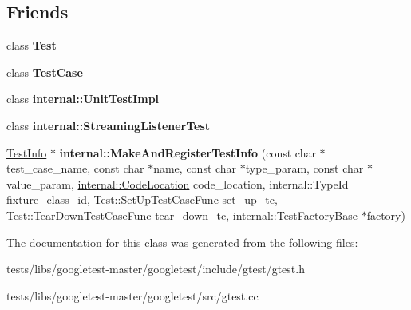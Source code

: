 \subsection*{Friends}
\begin{DoxyCompactItemize}
\item 
\mbox{\label{classtesting_1_1TestInfo_a5b78b1c2e1fa07ffed92da365593eaa4}} 
class {\bfseries Test}
\item 
\mbox{\label{classtesting_1_1TestInfo_aff779e55b06adfa7c0088bd10253f0f0}} 
class {\bfseries Test\+Case}
\item 
\mbox{\label{classtesting_1_1TestInfo_acc0a5e7573fd6ae7ad1878613bb86853}} 
class {\bfseries internal\+::\+Unit\+Test\+Impl}
\item 
\mbox{\label{classtesting_1_1TestInfo_adc037d188dab349a94868991955c9cd4}} 
class {\bfseries internal\+::\+Streaming\+Listener\+Test}
\item 
\mbox{\label{classtesting_1_1TestInfo_a70ddf8a12d8c05f17429f6381abc8ace}} 
\hyperlink{classtesting_1_1TestInfo}{Test\+Info} $\ast$ {\bfseries internal\+::\+Make\+And\+Register\+Test\+Info} (const char $\ast$test\+\_\+case\+\_\+name, const char $\ast$name, const char $\ast$type\+\_\+param, const char $\ast$value\+\_\+param, \hyperlink{structtesting_1_1internal_1_1CodeLocation}{internal\+::\+Code\+Location} code\+\_\+location, internal\+::\+Type\+Id fixture\+\_\+class\+\_\+id, Test\+::\+Set\+Up\+Test\+Case\+Func set\+\_\+up\+\_\+tc, Test\+::\+Tear\+Down\+Test\+Case\+Func tear\+\_\+down\+\_\+tc, \hyperlink{classtesting_1_1internal_1_1TestFactoryBase}{internal\+::\+Test\+Factory\+Base} $\ast$factory)
\end{DoxyCompactItemize}


The documentation for this class was generated from the following files\+:\begin{DoxyCompactItemize}
\item 
tests/libs/googletest-\/master/googletest/include/gtest/gtest.\+h\item 
tests/libs/googletest-\/master/googletest/src/gtest.\+cc\end{DoxyCompactItemize}
